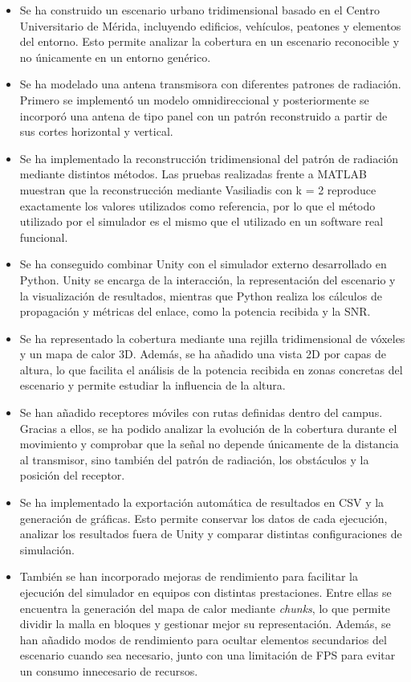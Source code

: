 \begin{itemize}
    \item Se ha construido un escenario urbano tridimensional basado en el Centro Universitario de Mérida, incluyendo edificios, vehículos, peatones y elementos del entorno. Esto permite analizar la cobertura en un escenario reconocible y no únicamente en un entorno genérico.

    \item Se ha modelado una antena transmisora con diferentes patrones de radiación. Primero se implementó un modelo omnidireccional y posteriormente se incorporó una antena de tipo panel con un patrón reconstruido a partir de sus cortes horizontal y vertical.

    \item Se ha implementado la reconstrucción tridimensional del patrón de radiación mediante distintos métodos. Las pruebas realizadas frente a MATLAB muestran que la reconstrucción mediante Vasiliadis con k = 2 reproduce exactamente los valores utilizados como referencia, por lo que el método utilizado por el simulador es el mismo que el utilizado en un software real funcional.

    \item Se ha conseguido combinar Unity con el simulador externo desarrollado en Python. Unity se encarga de la interacción, la representación del escenario y la visualización de resultados, mientras que Python realiza los cálculos de propagación y métricas del enlace, como la potencia recibida y la SNR.

    \item Se ha representado la cobertura mediante una rejilla tridimensional de vóxeles y un mapa de calor 3D. Además, se ha añadido una vista 2D por capas de altura, lo que facilita el análisis de la potencia recibida en zonas concretas del escenario y permite estudiar la influencia de la altura.

    \item Se han añadido receptores móviles con rutas definidas dentro del campus. Gracias a ellos, se ha podido analizar la evolución de la cobertura durante el movimiento y comprobar que la señal no depende únicamente de la distancia al transmisor, sino también del patrón de radiación, los obstáculos y la posición del receptor.

    \item Se ha implementado la exportación automática de resultados en CSV y la generación de gráficas. Esto permite conservar los datos de cada ejecución, analizar los resultados fuera de Unity y comparar distintas configuraciones de simulación.

    \item También se han incorporado mejoras de rendimiento para facilitar la ejecución del simulador en equipos con distintas prestaciones. Entre ellas se encuentra la generación del mapa de calor mediante \textit{chunks}, lo que permite dividir la malla en bloques y gestionar mejor su representación. Además, se han añadido modos de rendimiento para ocultar elementos secundarios del escenario cuando sea necesario, junto con una limitación de FPS para evitar un consumo innecesario de recursos.
\end{itemize}

